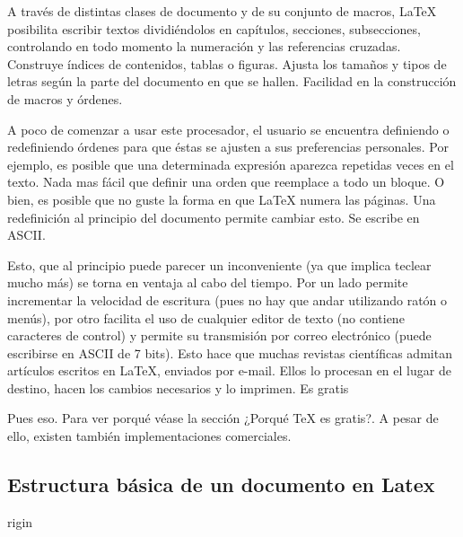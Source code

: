 \documentclass[11pt,letterpaper]{article}
\begin{document}
    A través de distintas clases de documento y de su conjunto de macros, LaTeX posibilita escribir textos dividiéndolos en capítulos, secciones, subsecciones, controlando en todo momento la numeración y las referencias cruzadas. Construye índices de contenidos, tablas o figuras. Ajusta los tamaños y tipos de letras según la parte del documento en que se hallen.
Facilidad en la construcción de macros y órdenes.

    A poco de comenzar a usar este procesador, el usuario se encuentra definiendo o redefiniendo órdenes para que éstas se ajusten a sus preferencias personales. Por ejemplo, es posible que una determinada expresión aparezca repetidas veces en el texto. Nada mas fácil que definir una orden que reemplace a todo un bloque. O bien, es posible que no guste la forma en que LaTeX numera las páginas. Una redefinición al principio del documento permite cambiar esto.
Se escribe en ASCII.

    Esto, que al principio puede parecer un inconveniente (ya que implica teclear mucho más) se torna en ventaja al cabo del tiempo. Por un lado permite incrementar la velocidad de escritura (pues no hay que andar utilizando ratón o menús), por otro facilita el uso de cualquier editor de texto (no contiene caracteres de control) y permite su transmisión por correo electrónico (puede escribirse en ASCII de 7 bits). Esto hace que muchas revistas científicas admitan artículos escritos en LaTeX, enviados por e-mail. Ellos lo procesan en el lugar de destino, hacen los cambios necesarios y lo imprimen.
Es gratis

    Pues eso. Para ver porqué véase la sección ¿Porqué TeX es gratis?. A pesar de ello, existen también implementaciones comerciales.

\subsection{Estructura básica de un documento en Latex}rigin
\end{document}
